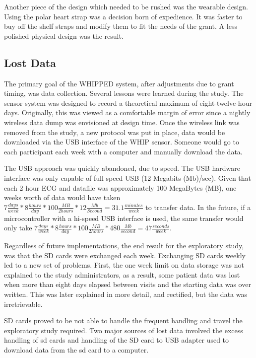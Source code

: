 Another piece of the design which needed to be rushed was the wearable design. Using the polar heart strap was a decision born of expedience. It was faster to buy off the shelf straps and modify them to fit the needs of the grant. A less polished physical design was the result.

\subsection {Lost Data}
The primary goal of the WHIPPED system, after adjustments due to grant timing, was data collection. Several lessons were learned during the study. The sensor system was designed to record a theoretical maximum of eight-twelve-hour days. Originally, this was viewed as a comfortable margin of error since a nightly wireless data dump was envisioned at design time. Once the wireless link was removed from the study, a new protocol was put in place, data would be downloaded via the USB interface of the WHIP sensor. Someone would go to each participant each week with a computer and manually download the data.

The USB approach was quickly abandoned, due to speed. The USB hardware interface was only capable of full-speed USB (12 Megabits (Mb)/sec). Given that each 2 hour ECG and  datafile was approximately 100 MegaBytes (MB), one weeks worth of data would have taken $ 7 \frac{days}{week} * 8 \frac{hours}{day} * 100 \frac{MB}{2 hours} * 12 \frac{Mb}{Second} = 31.1 \frac{minutes}{week}$ to transfer data. In the future, if a microcontroller with a hi-speed USB interface is used, the same transfer would only take $ 7 \frac{days}{week} * 8 \frac{hours}{day} * 100 \frac{MB}{2 hours} * 480 \frac{Mb}{second} = 47 \frac{seconds}{week}$.  

Regardless of future implementations, the end result for the exploratory study, was that the SD cards were exchanged each week. 
Exchanging SD cards weekly led to a new set of problems. First, the one week limit on data storage was not explained to the study administrators, as a result, some patient data was lost when more than eight days elapsed between visits and the starting data was over written. This was later explained in more detail, and rectified, but the data was irretrievable. 

SD cards proved to be not able to handle the frequent handling and travel the exploratory study required. Two major sources of lost data involved the excess handling of sd cards and handling of the SD card to USB adapter used to download data from the sd card to a computer.

